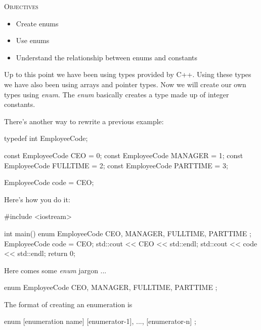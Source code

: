\newpage{}

\textsc{Objectives}
\begin{itemize}
\item Create enums
\item Use enums
\item Understand the relationship between enums and constants
\end{itemize}

Up to this point we have been using types provided by C++. Using these
types we have also been using arrays and pointer types. Now we will
create our own types using \textit{enum}. The \textit{enum} basically
creates a type made up of integer constants.


\newpage{}

There's another way to rewrite a previous example:

\begin{consolethree}[escapeinside=||]
typedef int EmployeeCode;

const EmployeeCode CEO = 0;
const EmployeeCode MANAGER = 1;
const EmployeeCode FULLTIME = 2;
const EmployeeCode PARTTIME = 3;

EmployeeCode code = CEO;
\end{consolethree}

Here's how you do it:

\begin{consolethree}[escapeinside=||]
#include <iostream>

int main()
{
    enum EmployeeCode
    {
        CEO, MANAGER, FULLTIME, PARTTIME
    };
    EmployeeCode code = CEO;
    std::cout << CEO << std::endl;
    std::cout << code << std::endl;
    return 0;
}
\end{consolethree}

Here comes some \textit{enum} jargon ...

\begin{consolethree}[escapeinside=||]
enum EmployeeCode
{
    CEO, MANAGER, FULLTIME, PARTTIME
};
\end{consolethree}

The format of creating an enumeration is

\begin{consolethree}[escapeinside=||]
enum [enumeration name]
{
    [enumerator-1], ...,
    [enumerator-n]
};
\end{consolethree}



